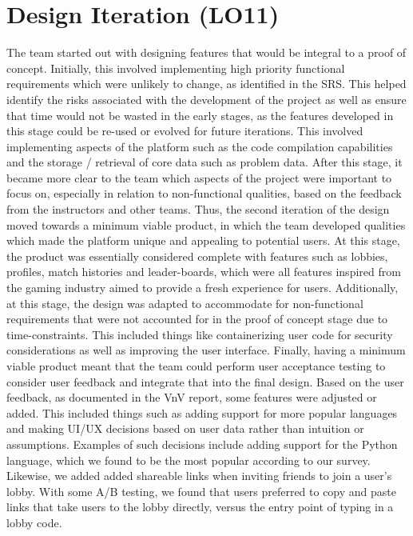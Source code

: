 \documentclass[12pt, titlepage]{article}
\begin{document}
\section{Design Iteration (LO11)}


The team started out with designing features that would be integral to a proof of concept. Initially, this involved implementing high priority functional requirements which were unlikely to change, as identified in the SRS. This helped identify the risks associated with the development of the project as well as ensure that time would not be wasted in the early stages, as the features developed in this stage could be re-used or evolved for future iterations. This involved implementing aspects of the platform such as the code compilation capabilities and the storage / retrieval of core data such as problem data. After this stage, it became more clear to the team which aspects of the project were important to focus on, especially in relation to non-functional qualities, based on the feedback from the instructors and other teams. Thus, the second iteration of the design moved towards a minimum viable product, in which the team developed qualities which made the platform unique and appealing to potential users. At this stage, the product was essentially considered complete with features such as lobbies, profiles, match histories and leader-boards, which were all features inspired from the gaming industry aimed to provide a fresh experience for users. Additionally, at this stage, the design was adapted to accommodate for non-functional requirements that were not accounted for in the proof of concept stage due to time-constraints. This included things like containerizing user code for security considerations as well as improving the user interface. Finally, having a minimum viable product meant that the team could perform user acceptance testing to consider user feedback and integrate that into the final design. Based on the user feedback, as documented in the VnV report, some features were adjusted or added. This included things such as adding support for more popular languages and making UI/UX decisions based on user data rather than intuition or assumptions. Examples of such decisions include adding support for the Python language, which we found to be the most popular according to our survey. Likewise, we added added shareable links when inviting friends to join a user's lobby. With some A/B testing, we found that users preferred to copy and paste links that take users to the lobby directly, versus the entry point of typing in a lobby code.
\end{document}
